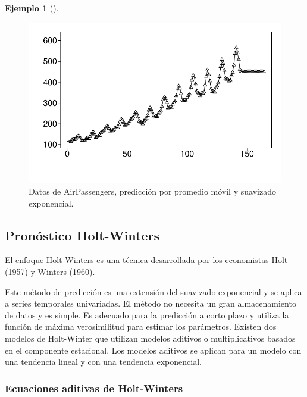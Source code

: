 \documentclass[
  us-letterpaper,
]{scrreprt}
\theoremstyle{plain}
\theoremstyle{definition}
\theoremstyle{definition}
\newtheorem{example}{Ejemplo}[chapter]
\theoremstyle{plain}
\theoremstyle{remark}
\begin{document}
\begin{example}[]
\begin{tcolorbox}
\begin{figure}[H]
\begin{minipage}{0.33\linewidth}
{\includegraphics{series_files/figure-pdf/fig-PAP-3.pdf}

}


\end{minipage}%

\caption{\label{fig-PAP}Datos de AirPassengers, predicción por promedio
móvil y suavizado exponencial.}

\end{figure}%

\end{tcolorbox}

\end{example}

\subsection{Pronóstico Holt-Winters}\label{pronuxf3stico-holt-winters}

El enfoque Holt-Winters es una técnica desarrollada por los economistas
Holt (1957) y Winters (1960).

Este método de predicción es una extensión del suavizado exponencial y
se aplica a series temporales univariadas. El método no necesita un gran
almacenamiento de datos y es simple. Es adecuado para la predicción a
corto plazo y utiliza la función de máxima verosimilitud para estimar
los parámetros. Existen dos modelos de Holt-Winter que utilizan modelos
aditivos o multiplicativos basados en el componente estacional. Los
modelos aditivos se aplican para un modelo con una tendencia lineal y
con una tendencia exponencial.

\subsubsection{Ecuaciones aditivas de
Holt-Winters}\label{ecuaciones-aditivas-de-holt-winters}
\end{document}
